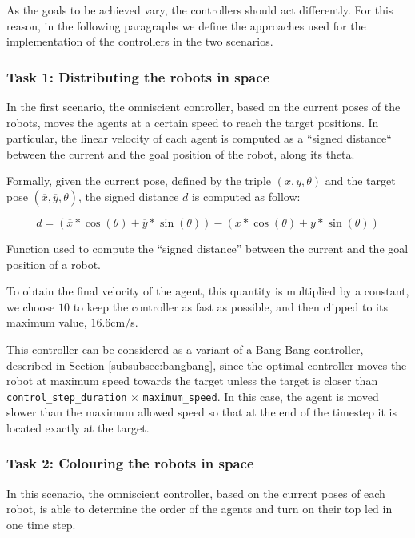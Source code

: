As the goals to be achieved vary, the controllers should act differently. For this 
reason, in the following paragraphs we define the approaches used for the 
implementation of the controllers in the two scenarios.

\subsubsection{Task 1: Distributing the robots in space}
\label{subsubsec:experttask1}

In the first scenario, the omniscient controller, based on the current poses of the 
robots, moves the agents at a certain speed to reach the target positions. In 
particular, the linear velocity of each agent is computed as a ``signed distance`` 
between the current and the goal position of the robot, along its theta. 

Formally, given the current pose, defined by the triple $(x, y, \theta)$ and the 
target pose $(\overline x, \overline y, \overline \theta)$, the signed distance $d$ 
is computed as follow:
\begin{Equation}[!htb]
	\centering
	\begin{equation}
	d = \left(\overline x * \cos (\theta) + \overline y * \sin (\theta)\right) -
	\left( x * \cos (\theta) + y * \sin (\theta)\right)
	\end{equation}
	\caption[Signed distance function.]{Function used to compute the ``signed 
		distance'' between the current and the goal position of a robot.}
	\label{eq:signeddist}
\end{Equation}

\noindent
To obtain the final velocity of the agent, this quantity is multiplied by a constant, 
we choose $10$ to keep the controller as fast as possible, and then clipped to its 
maximum value, $16.6$\gls{cm/s}.

This controller can be considered as a variant of a Bang Bang controller, described 
in Section \ref{subsubsec:bangbang}, since the optimal controller moves the 
robot at maximum speed towards the target unless the target is closer than 
\texttt{control\_step\_duration} $\times$ \texttt{maximum\_speed}. In this case, 
the agent is moved slower than the maximum allowed speed so that at the end of 
the timestep it is located exactly at the target.

\subsubsection{Task 2: Colouring the robots in space}
In this scenario, the omniscient controller, based on the current poses of each 
robot, is able to determine the order of the agents and turn on their top \gls{led}  
in one time step.


